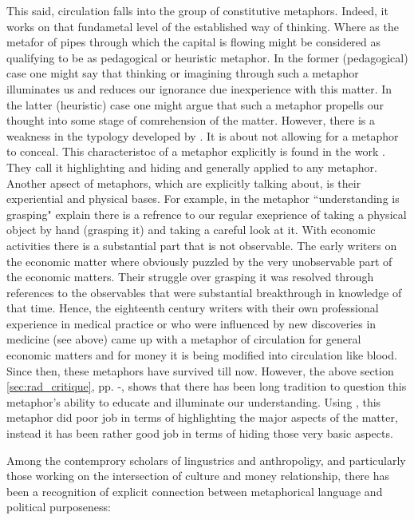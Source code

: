 This said, circulation falls into the group of constitutive metaphors. Indeed, it works on that fundametal level of the established way of thinking. Where as the metafor of pipes through which the capital is flowing might be considered as qualifying to be as pedagogical or heuristic metaphor.  In the former (pedagogical) case one might say that thinking or imagining through such a metaphor illuminates us and reduces our ignorance due inexperience with this matter. In the latter (heuristic) case one might argue that such a metaphor propells our thought into some stage of comrehension of the matter. However, there is a weakness in the typology developed by \citeauthor{klamer1994}. It is about not allowing for a metaphor to conceal. This characteristoc of a metaphor explicitly is found in the work \cite{lakoff1980}. They call it highlighting and hiding and generally applied to any metaphor. Another apsect of metaphors, which \cite{lakoff1980} are explicitly talking about, is their experiential and physical bases. For example, in the metaphor ``understanding is grasping"  \citeauthor {lakoff1980} explain there is a refrence to our regular exeprience of taking a physical object by hand (grasping it) and taking a careful look at it. With economic activities there is a substantial part that is not observable. The early writers on the economic matter where obviously puzzled by the very unobservable part of the economic matters. Their struggle over grasping it was resolved through references to the observables that were substantial breakthrough in knowledge of that time. Hence, the eighteenth century writers with their own professional experience in medical practice or who were influenced by new discoveries in medicine (see above) came up with a metaphor of circulation for general economic matters and for money it is being modified into circulation like blood. Since then, these metaphors have survived till now. However, the above section \ref{sec:rad_critique}, pp. \pageref{sec:rad_critique}-\pageref{sec:metaphor}, shows that there has been long tradition to question this metaphor's ability to educate and illuminate our understanding. Using \cite{lakoff1980}, this metaphor did poor job in terms of highlighting the major aspects of the matter, instead it has been rather good job in terms of hiding those very basic aspects.

Among the contemprory scholars of lingustrics and anthropoligy, and particularly those working on the intersection of culture and money relationship, there has been a recognition of explicit connection between metaphorical language and political purposeness:

